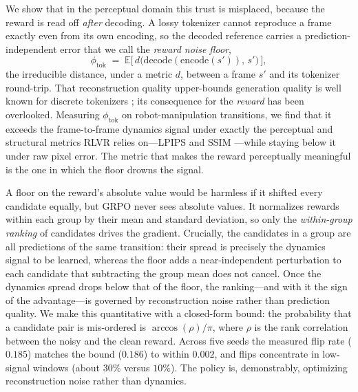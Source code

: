 \documentclass[letterpaper]{article} %
\begin{document}
We show that in the perceptual domain this trust is misplaced, because the reward is read off \emph{after} decoding. A lossy tokenizer cannot reproduce a frame exactly even from its own encoding, so the decoded reference carries a prediction-independent error that we call the \emph{reward noise floor},
\[
  \phi_{\text{tok}} \;=\; \mathbb{E}\big[\, d\big(\mathrm{decode}(\mathrm{encode}(s')),\, s'\big)\,\big],
\]
the irreducible distance, under a metric $d$, between a frame $s'$ and its tokenizer round-trip. That reconstruction quality upper-bounds generation quality is well known for discrete tokenizers \cite{vqvae,vqgan,fsq}; its consequence for the \emph{reward} has been overlooked. Measuring $\phi_{\text{tok}}$ on robot-manipulation transitions, we find that it exceeds the frame-to-frame dynamics signal under exactly the perceptual and structural metrics RLVR relies on---LPIPS \cite{lpips} and SSIM \cite{ssim}---while staying below it under raw pixel error. The metric that makes the reward perceptually meaningful is the one in which the floor drowns the signal.

A floor on the reward's absolute value would be harmless if it shifted every candidate equally, but GRPO never sees absolute values. It normalizes rewards within each group by their mean and standard deviation, so only the \emph{within-group ranking} of candidates drives the gradient. Crucially, the candidates in a group are all predictions of the same transition: their spread is precisely the dynamics signal to be learned, whereas the floor adds a near-independent perturbation to each candidate that subtracting the group mean does not cancel. Once the dynamics spread drops below that of the floor, the ranking---and with it the sign of the advantage---is governed by reconstruction noise rather than prediction quality. We make this quantitative with a closed-form bound: the probability that a candidate pair is mis-ordered is $\arccos(\rho)/\pi$, where $\rho$ is the rank correlation between the noisy and the clean reward. Across five seeds the measured flip rate ($0.185$) matches the bound ($0.186$) to within $0.002$, and flips concentrate in low-signal windows (about $30\%$ versus $10\%$). The policy is, demonstrably, optimizing reconstruction noise rather than dynamics.
\end{document}
